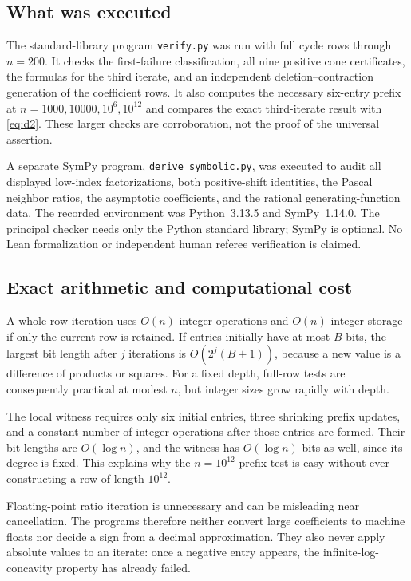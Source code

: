 \documentclass[11pt,a4paper]{article}
\theoremstyle{definition}
\begin{document}
\subsection{What was executed}
The standard-library program \texttt{verify.py} was run with full cycle
rows through $n=200$. It checks the first-failure classification, all nine
positive cone certificates, the formulas for the third iterate, and an
independent deletion--contraction generation of the coefficient rows.
It also computes the necessary six-entry prefix at
$n=1000,10000,10^6,10^{12}$ and compares the exact third-iterate result
with \eqref{eq:d2}. These larger checks are corroboration, not the proof
of the universal assertion.

A separate SymPy program, \texttt{derive\_symbolic.py}, was executed to
audit all displayed low-index factorizations, both positive-shift
identities, the Pascal neighbor ratios, the asymptotic coefficients, and
the rational generating-function data. The recorded environment was
Python~3.13.5 and SymPy~1.14.0. The principal checker needs only the Python
standard library; SymPy is optional. No Lean formalization or independent
human referee verification is claimed.

\subsection{Exact arithmetic and computational cost}
A whole-row iteration uses $O(n)$ integer operations and $O(n)$ integer
storage if only the current row is retained. If entries initially have
at most $B$ bits, the largest bit length after $j$ iterations is
$O(2^j(B+1))$, because a new value is a difference of products or squares.
For a fixed depth, full-row tests are consequently practical at modest
$n$, but integer sizes grow rapidly with depth.

The local witness requires only six initial entries, three shrinking
prefix updates, and a constant number of integer operations after those
entries are formed. Their bit lengths are $O(\log n)$, and the witness
has $O(\log n)$ bits as well, since its degree is fixed. This explains
why the $n=10^{12}$ prefix test is easy without ever constructing a row
of length $10^{12}$.

Floating-point ratio iteration is unnecessary and can be misleading
near cancellation. The programs therefore neither convert large
coefficients to machine floats nor decide a sign from a decimal
approximation. They also never apply absolute values to an iterate:
once a negative entry appears, the infinite-log-concavity property has
already failed.
\end{document}
